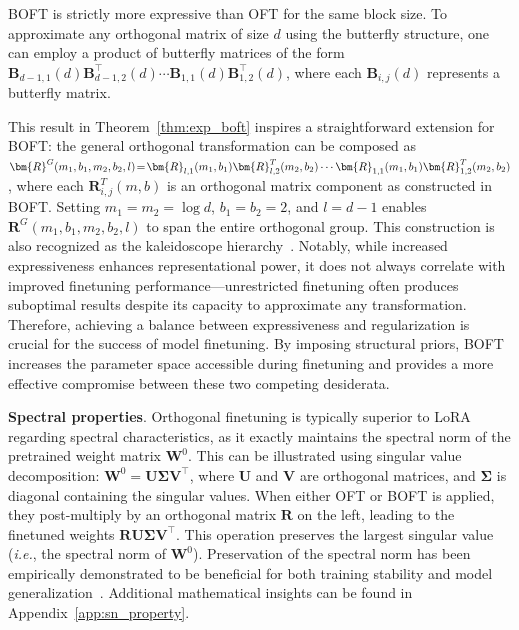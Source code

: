 \begin{theorem}\label{thm:exp_boft}
    BOFT is strictly more expressive than OFT for the same block size. To approximate any orthogonal matrix of size $d$ using the butterfly structure, one can employ a product of butterfly matrices of the form $\bm{B}_{d-1,1}(d)\bm{B}^\top_{d-1,2}(d)\cdots\bm{B}_{1,1}(d)\bm{B}^\top_{1,2}(d)$, where each $\bm{B}_{i,j}(d)$ represents a butterfly matrix.
\end{theorem}

This result in Theorem~\ref{thm:exp_boft} inspires a straightforward extension for BOFT: the general orthogonal transformation can be composed as $\thickmuskip=2mu \medmuskip=2mu \bm{R}^G(m_1,b_1,m_2,b_2,l)=\bm{R}_{l,1}(m_1,b_1)\bm{R}_{l,2}^T(m_2,b_2)\cdots\bm{R}_{1,1}(m_1,b_1)\bm{R}_{1,2}^T(m_2,b_2)$, where each $\bm{R}_{i,j}^T(m,b)$ is an orthogonal matrix component as constructed in BOFT. Setting $m_1=m_2=\log d$, $b_1=b_2=2$, and $l=d-1$ enables $\bm{R}^G(m_1,b_1,m_2,b_2,l)$ to span the entire orthogonal group. This construction is also recognized as the kaleidoscope hierarchy~\cite{dao2019kaleidoscope}. Notably, while increased expressiveness enhances representational power, it does not always correlate with improved finetuning performance—unrestricted finetuning often produces suboptimal results despite its capacity to approximate any transformation. Therefore, achieving a balance between expressiveness and regularization is crucial for the success of model finetuning. By imposing structural priors, BOFT increases the parameter space accessible during finetuning and provides a more effective compromise between these two competing desiderata.

\textbf{Spectral properties}. Orthogonal finetuning is typically superior to LoRA regarding spectral characteristics, as it exactly maintains the spectral norm of the pretrained weight matrix $\bm{W}^0$. This can be illustrated using singular value decomposition: $\bm{W}^0=\bm{U}\bm{\Sigma}\bm{V}^\top$, where $\bm{U}$ and $\bm{V}$ are orthogonal matrices, and $\bm{\Sigma}$ is diagonal containing the singular values. When either OFT or BOFT is applied, they post-multiply by an orthogonal matrix $\bm{R}$ on the left, leading to the finetuned weights $\bm{R}\bm{U}\bm{\Sigma}\bm{V}^\top$. This operation preserves the largest singular value (\emph{i.e.}, the spectral norm of $\bm{W}^0$). Preservation of the spectral norm has been empirically demonstrated to be beneficial for both training stability and model generalization~\cite{miyato2018spectral, yoshida2017spectral}. Additional mathematical insights can be found in Appendix~\ref{app:sn_property}.

